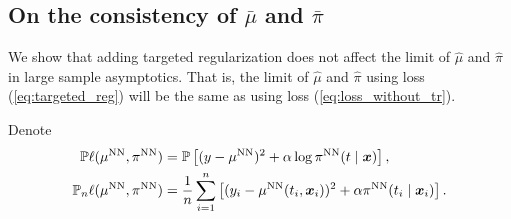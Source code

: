 \subsection{On the consistency of $\bar{\mu}$ and $\bar{\pi}$} \label{apxsec: consistency}
We show that adding targeted regularization does not affect the limit of $\hat{\mu}$ and $\hat{\pi}$ in large sample asymptotics. That is, the limit of $\hat{\mu}$ and $\hat{\pi}$ using loss (\ref{eq:targeted_reg}) will be the same as using loss (\ref{eq:loss_without_tr}).

Denote
\begin{align*}
\mathbb{P}\ell(\mu^{\text{NN}},\pi^{\text{NN}}) & =\mathbb{P}\left[(y-\mu^{\text{NN}})^{2}+\alpha\log\pi^{\text{NN}}(t\mid\boldsymbol{x})\right],\\
\mathbb{P}_{n}\ell(\mu^{\text{NN}},\pi^{\text{NN}}) & =\frac{1}{n}\sum_{i=1}^{n}\left[(y_{i}-\mu^{\text{NN}}(t_{i},\boldsymbol{x}_{i}))^{2}+\alpha\pi^{\text{NN}}(t_{i}\mid\boldsymbol{x}_{i})\right].
\end{align*}

